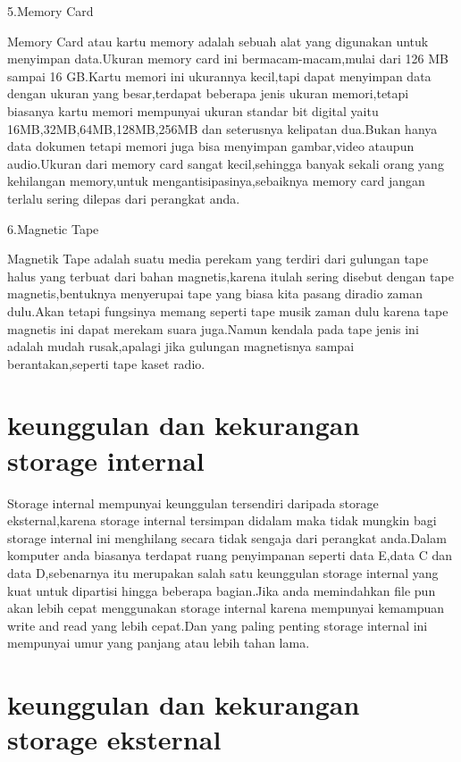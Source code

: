 5.Memory Card

Memory Card atau kartu memory adalah sebuah alat yang digunakan untuk menyimpan data.Ukuran memory card ini bermacam-macam,mulai dari 126 MB sampai 16 GB.Kartu memori ini ukurannya kecil,tapi dapat menyimpan data dengan ukuran yang besar,terdapat beberapa jenis ukuran memori,tetapi biasanya kartu memori mempunyai ukuran standar bit digital yaitu 16MB,32MB,64MB,128MB,256MB dan seterusnya kelipatan dua.Bukan hanya data dokumen tetapi memori juga bisa menyimpan gambar,video ataupun audio.Ukuran dari memory card sangat kecil,sehingga banyak sekali orang yang kehilangan memory,untuk mengantisipasinya,sebaiknya memory card jangan terlalu sering dilepas dari perangkat anda.

6.Magnetic Tape

Magnetik Tape adalah suatu media perekam yang terdiri dari gulungan tape halus yang terbuat dari bahan magnetis,karena itulah sering disebut dengan tape magnetis,bentuknya menyerupai tape yang biasa kita pasang diradio zaman dulu.Akan tetapi fungsinya memang seperti tape musik zaman dulu karena tape magnetis ini dapat merekam suara juga.Namun kendala pada tape jenis ini adalah mudah rusak,apalagi jika gulungan magnetisnya sampai berantakan,seperti tape kaset radio.


\section{keunggulan dan kekurangan storage internal}

Storage internal mempunyai keunggulan tersendiri daripada storage eksternal,karena storage internal tersimpan didalam maka tidak mungkin bagi storage internal ini menghilang secara tidak sengaja dari perangkat anda.Dalam komputer anda biasanya terdapat ruang penyimpanan seperti data E,data C dan data D,sebenarnya itu merupakan salah satu keunggulan storage internal yang kuat untuk dipartisi hingga beberapa bagian.Jika anda memindahkan file pun akan lebih cepat menggunakan storage internal karena mempunyai kemampuan write and read yang lebih cepat.Dan yang paling penting storage internal ini mempunyai umur yang panjang atau lebih tahan lama.

\section{keunggulan dan kekurangan storage eksternal}

